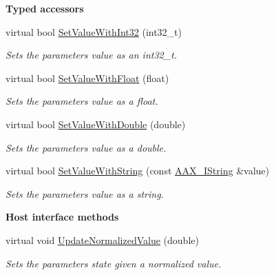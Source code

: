 \begin{Indent}{\bf Typed accessors}
\begin{DoxyCompactItemize}
virtual bool \hyperlink{a00040_aafa623e6e0c78113545d1c790d182e1e}{Set\+Value\+With\+Int32} (int32\+\_\+t)
\begin{DoxyCompactList}\small\item\em Sets the parameter\textquotesingle{}s value as an int32\+\_\+t. \end{DoxyCompactList}\item 
virtual bool \hyperlink{a00040_af96e2d1fa89fe1e77acf832385c565c6}{Set\+Value\+With\+Float} (float)
\begin{DoxyCompactList}\small\item\em Sets the parameter\textquotesingle{}s value as a float. \end{DoxyCompactList}\item 
virtual bool \hyperlink{a00040_aa3410ab97e394a92a5ccce54b555496e}{Set\+Value\+With\+Double} (double)
\begin{DoxyCompactList}\small\item\em Sets the parameter\textquotesingle{}s value as a double. \end{DoxyCompactList}\item 
virtual bool \hyperlink{a00040_ad0264ba195cf7c0c024cef1b86a1a749}{Set\+Value\+With\+String} (const \hyperlink{a00113}{A\+A\+X\+\_\+\+I\+String} \&value)
\begin{DoxyCompactList}\small\item\em Sets the parameter\textquotesingle{}s value as a string. \end{DoxyCompactList}\end{DoxyCompactItemize}
\end{Indent}
\begin{Indent}{\bf Host interface methods}\par
\begin{DoxyCompactItemize}
\item 
virtual void \hyperlink{a00040_aedecf22f14aee85864ab356896aee8e3}{Update\+Normalized\+Value} (double)
\begin{DoxyCompactList}\small\item\em Sets the parameter\textquotesingle{}s state given a normalized value. \end{DoxyCompactList}\end{DoxyCompactItemize}
\end{Indent}
